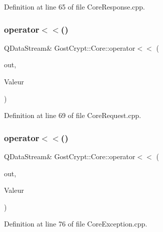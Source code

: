 Definition at line 65 of file Core\+Response.\+cpp.

\mbox{\label{namespace_gost_crypt_1_1_core_adf8e3302a7b82cfd6cb07ab1969252a5}} 
\subsubsection{\texorpdfstring{operator$<$$<$()}{operator<<()}\hspace{0.1cm}{\footnotesize\ttfamily [10/56]}}
{\footnotesize\ttfamily Q\+Data\+Stream\& Gost\+Crypt\+::\+Core\+::operator$<$$<$ (\begin{DoxyParamCaption}\item[{Q\+Data\+Stream \&}]{out,  }\item[{const \hyperlink{struct_gost_crypt_1_1_core_1_1_create_volume_request_1_1_volume_params}{Create\+Volume\+Request\+::\+Volume\+Params} \&}]{Valeur }\end{DoxyParamCaption})}



Definition at line 69 of file Core\+Request.\+cpp.

\mbox{\label{namespace_gost_crypt_1_1_core_aa824776b7aefccca76fb477059923da8}} 
\subsubsection{\texorpdfstring{operator$<$$<$()}{operator<<()}\hspace{0.1cm}{\footnotesize\ttfamily [11/56]}}
{\footnotesize\ttfamily Q\+Data\+Stream\& Gost\+Crypt\+::\+Core\+::operator$<$$<$ (\begin{DoxyParamCaption}\item[{Q\+Data\+Stream \&}]{out,  }\item[{const \hyperlink{class_gost_crypt_1_1_core_1_1_volume_not_mounted}{Gost\+Crypt\+::\+Core\+::\+Volume\+Not\+Mounted} \&}]{Valeur }\end{DoxyParamCaption})}



Definition at line 76 of file Core\+Exception.\+cpp.

